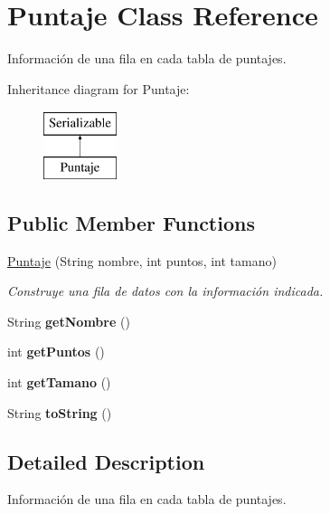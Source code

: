 \hypertarget{class_puntaje}{}\section{Puntaje Class Reference}
\label{class_puntaje}


Información de una fila en cada tabla de puntajes.  


Inheritance diagram for Puntaje\+:\begin{figure}[H]
\begin{center}
\leavevmode
\includegraphics[height=2.000000cm]{class_puntaje}
\end{center}
\end{figure}
\subsection*{Public Member Functions}
\begin{DoxyCompactItemize}
\item 
\mbox{\hyperlink{class_puntaje_a66330c08cb2e451370489d26b0ef20c1}{Puntaje}} (String nombre, int puntos, int tamano)
\begin{DoxyCompactList}\small\item\em Construye una fila de datos con la información indicada. \end{DoxyCompactList}\item 
\mbox{\label{class_puntaje_a5264405a77ab9884e8f3a4a9117d4273}} 
String {\bfseries get\+Nombre} ()
\item 
\mbox{\label{class_puntaje_a74f9d10f035df4ae417094b6b0d06839}} 
int {\bfseries get\+Puntos} ()
\item 
\mbox{\label{class_puntaje_a9657b9127f63f2ad40ea36c2b7dfc374}} 
int {\bfseries get\+Tamano} ()
\item 
\mbox{\label{class_puntaje_a847332131e62ee45ace5d1e6b89ef275}} 
String {\bfseries to\+String} ()
\end{DoxyCompactItemize}


\subsection{Detailed Description}
Información de una fila en cada tabla de puntajes. 


